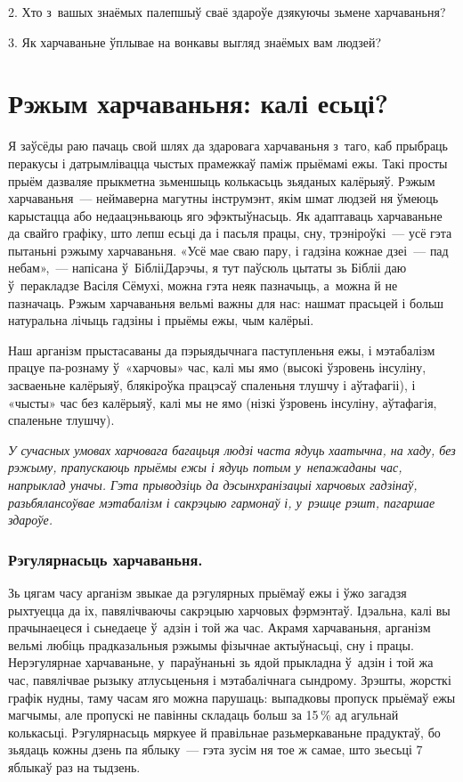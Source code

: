 2. Хто з~вашых знаёмых палепшыў сваё здароўе дзякуючы зьмене харчаваньня?

3. Як харчаваньне ўплывае на вонкавы выгляд знаёмых вам людзей?


\section{Рэжым харчаваньня: калі есьці?}

Я заўсёды раю пачаць свой шлях да здаровага харчаваньня з~таго, каб прыбраць перакусы і датрымлівацца чыстых прамежкаў паміж прыёмамі ежы. Такі просты прыём дазваляе прыкметна зьменшыць колькасьць зьяданых калёрыяў. Рэжым харчаваньня~--- неймаверна магутны інструмэнт, якім шмат людзей ня ўмеюць карыстацца або недаацэньваюць яго эфэктыўнасьць. Як адаптаваць харчаваньне да свайго графіку, што лепш есьці да і пасьля працы, сну, трэніроўкі~--- усё гэта пытаньні рэжыму харчаваньня. «Усё мае сваю пару, і гадзіна кожнае дзеі~--- пад небам»,~--- напісана ў~БіблііДарэчы, я тут паўсюль цытаты зь Бібліі даю ў~перакладзе Васіля Сёмухі, можна гэта неяк пазначыць, а~можна й не пазначаць. Рэжым харчаваньня вельмі важны для нас: нашмат прасьцей і больш натуральна лічыць гадзіны і прыёмы ежы, чым калёрыі. 


Наш арганізм прыстасаваны да пэрыядычнага паступленьня ежы, і мэтабалізм працуе па-рознаму ў~«харчовы» час, калі мы ямо (высокі ўзровень інсуліну, засваеньне калёрыяў, блякіроўка працэсаў спаленьня тлушчу і аўтафагіі), і «чысты» час без калёрыяў, калі мы не ямо (нізкі ўзровень інсуліну, аўтафагія, спаленьне тлушчу).

\emph{У сучасных умовах харчовага багацьця людзі часта ядуць хаатычна, на хаду, без рэжыму, прапускаюць прыёмы ежы і ядуць потым у~непажаданы час, напрыклад уначы. Гэта прыводзіць да дэсынхранізацыі харчовых гадзінаў, разьбялансоўвае мэтабалізм і сакрэцыю гармонаў і, у~рэшце рэшт, пагаршае здароўе.}

\subsubsection{Рэгулярнасьць харчаваньня.} 
Зь цягам часу арганізм звыкае да рэгулярных прыёмаў ежы і ўжо загадзя рыхтуецца да іх, павялічваючы сакрэцыю харчовых фэрмэнтаў. Ідэальна, калі вы прачынаецеся і сьнедаеце ў~адзін і той жа час. Акрамя харчаваньня, арганізм вельмі любіць прадказальныя рэжымы фізычнае актыўнасьці, сну і працы. Нерэгулярнае харчаваньне, у~параўнаньні зь ядой прыкладна ў~адзін і той жа час, павялічвае рызыку атлусьценьня і мэтабалічнага сындрому. Зрэшты, жорсткі графік нудны, таму часам яго можна парушаць: выпадковы пропуск прыёмаў ежы магчымы, але пропускі не павінны складаць больш за 15\,\% ад агульнай колькасьці. Рэгулярнасьць мяркуее й правільнае разьмеркаваньне прадуктаў, бо зьядаць кожны дзень па яблыку~--- гэта зусім ня тое ж самае, што зьесьці 7 яблыкаў раз на тыдзень.

